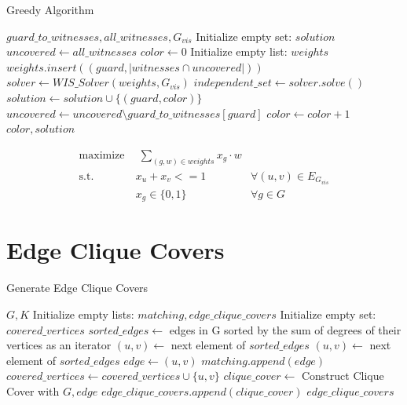 \begin{algorithm}
\caption{Greedy Algorithm}\label{alg:greedy}
\begin{algorithmic}[1]
\REQUIRE $guard\_to\_witnesses, all\_witnesses, G_{vis}$
\STATE Initialize empty set: $solution$
\STATE $uncovered\gets all\_witnesses$
\STATE $color\gets 0$
    \STATE Initialize empty list: $weights$
        \STATE $weights.insert((guard, |witnesses\cap uncovered|))$
    \ENDFOR
    \STATE $solver\gets WIS\_Solver(weights, G_{vis})$
    \STATE $independent\_set\gets solver.solve()$
        \STATE $solution\gets solution\cup \{(guard, color)\}$
        \STATE $uncovered\gets uncovered\setminus guard\_to\_witnesses[guard]$
    \ENDFOR 
    \STATE $color\gets color + 1$
\ENDWHILE
\RETURN $color, solution$
\end{algorithmic}
\end{algorithm}

\begin{align}
\label{eq_MIP:f.0} \mbox{maximize}~& \;\sum_{(g, w)\in weights} x_{g}\cdot w& \\
\label{eq_MIP:f.1} \mbox{s.t. } &x_{u} + x_{v} <= 1 & \forall (u,v) \in E_{G_{vis}}\\
\label{eq_MIP:f.6}& x_{g} \in \{0,1\} & \forall g\in G
\end{align}

\section{Edge Clique Covers}

\begin{algorithm}
\caption{Generate Edge Clique Covers}
\begin{algorithmic}[1]
\REQUIRE $G, K$
\STATE Initialize empty lists: $matching, edge\_clique\_covers$
\STATE Initialize empty set: $covered\_vertices$
\STATE $sorted\_edges\gets$ edges in G sorted by the sum of degrees of their vertices as an iterator
    \STATE $(u, v)\gets$ next element of $sorted\_edges$
        \STATE $(u, v)\gets$ next element of $sorted\_edges$
    \ENDWHILE
    \STATE $edge\gets (u, v)$
    \STATE $matching.append(edge)$
    \STATE $covered\_vertices\gets covered\_vertices\cup \{u, v\}$
\ENDFOR
{}
    \STATE $clique\_cover\gets$ Construct Clique Cover with $G, edge$
    \STATE $edge\_clique\_covers.append(clique\_cover)$
\ENDFOR
\RETURN $edge\_clique\_covers$
\end{algorithmic}
\end{algorithm}


